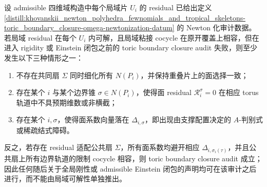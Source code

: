 \begin{theorem}\label{distill:khovanskii_newton_polyhedra_fewnomials_and_tropical_skeletons-toric_boundary_closure-boundary-failure-trichotomy}
设 admissible 四维域构造中每个局域片 \(U_i\) 的 residual 已给出定义 \ref{distill:khovanskii_newton_polyhedra_fewnomials_and_tropical_skeletons-toric_boundary_closure-omega-newtonization-datum} 的 Newton 化审计数据。若局域 residual 在每个 \(U_i\) 内可解，且局域粘接 cocycle 在原开覆盖上相容，但在进入 rigidity 或 Einstein 闭包之前的 toric boundary closure audit 失败，则至少发生以下三种情形之一：
\begin{enumerate}
  \item 不存在共同扇 \(\Sigma\) 同时细化所有 \(N(P_i)\)，并保持重叠片上的面选择一致；
  \item 存在某个 \(i\) 与某个边界锥 \(\sigma\in N(P_i)\)，使得面 residual \(\mathcal R_i^{\sigma}=0\) 在相应 torus 轨道中不具预期维数或非横截；
  \item 存在某个 \(i,\sigma\)，使得面系数向量落在 \(\Delta_{i,\sigma}\)，即出现由支撑配置决定的 \(A\)-判别式或稀疏结式障碍。
\end{enumerate}
反之，若存在 residual 适配公共扇 \(\Sigma\)，所有面系数均避开相应 \(\Delta_{i,\sigma_i(\tau)}\)，并且公共扇上所有边界轨道的限制 cocycle 相容，则 toric boundary closure audit 成立；因此任何随后关于全局刚性或 admissible Einstein 闭包的声明均可在该审计之后进行，而不能由局域可解性单独推出。
\end{theorem}
